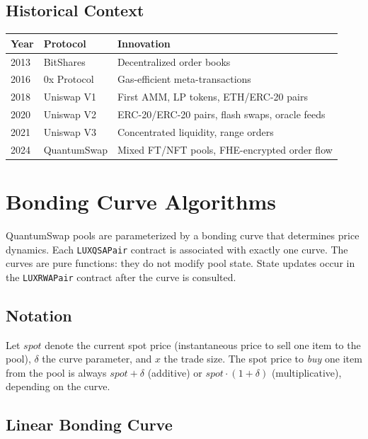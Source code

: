 \documentclass[11pt,a4paper]{article}
\begin{document}
\subsection{Historical Context}

\begin{center}
\begin{tabular}{lll}
\toprule
\textbf{Year} & \textbf{Protocol} & \textbf{Innovation} \\
\midrule
2013 & BitShares & Decentralized order books \\
2016 & 0x Protocol & Gas-efficient meta-transactions \\
2018 & Uniswap V1 & First AMM, LP tokens, ETH/ERC-20 pairs \\
2020 & Uniswap V2 & ERC-20/ERC-20 pairs, flash swaps, oracle feeds \\
2021 & Uniswap V3 & Concentrated liquidity, range orders~\cite{uniswapv3} \\
2024 & QuantumSwap & Mixed FT/NFT pools, FHE-encrypted order flow \\
\bottomrule
\end{tabular}
\end{center}

\section{Bonding Curve Algorithms}

QuantumSwap pools are parameterized by a bonding curve that determines
price dynamics. Each \texttt{LUXQSAPair} contract is associated with
exactly one curve. The curves are pure functions: they do not modify
pool state. State updates occur in the \texttt{LUXRWAPair} contract
after the curve is consulted.

\subsection{Notation}

Let $\mathit{spot}$ denote the current spot price (instantaneous price
to sell one item to the pool), $\delta$ the curve parameter, and $x$
the trade size. The spot price to \emph{buy} one item from the pool is
always $\mathit{spot} + \delta$ (additive) or $\mathit{spot} \cdot
(1 + \delta)$ (multiplicative), depending on the curve.

\subsection{Linear Bonding Curve}
\end{document}
